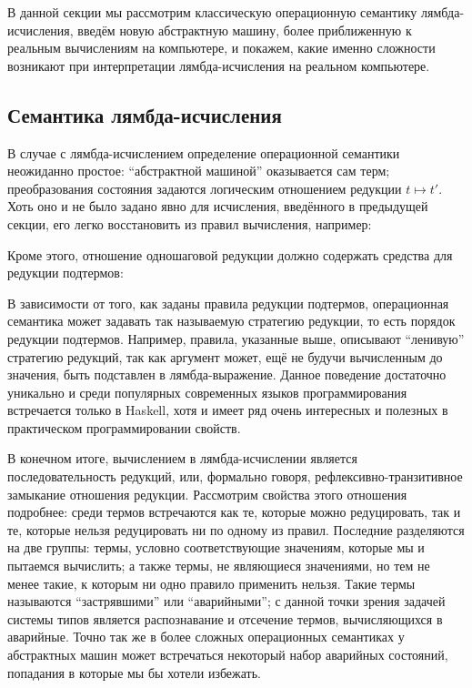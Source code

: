 \documentclass[12pt]{article}
\begin{document}
В данной секции мы рассмотрим классическую операционную семантику
лямбда-исчисления, введём новую абстрактную машину, более приближенную к
реальным вычислениям на компьютере, и покажем, какие именно сложности возникают
при интерпретации лямбда-исчисления на реальном компьютере.

\subsection{Семантика лямбда-исчисления}

В случае с лямбда-исчислением определение операционной семантики неожиданно
простое: ``абстрактной машиной'' оказывается сам терм; преобразования состояния
задаются логическим отношением редукции $t \mapsto t'$. Хоть оно и не было
задано явно для исчисления, введённого в предыдущей секции, его легко
восстановить из правил вычисления, например:

Кроме этого, отношение одношаговой редукции должно содержать средства для
редукции подтермов:

В зависимости от того, как заданы правила редукции подтермов, операционная
семантика может задавать так называемую стратегию редукции, то есть порядок
редукции подтермов. Например, правила, указанные выше, описывают ``ленивую''
стратегию редукций, так как аргумент может, ещё не будучи вычисленным до
значения, быть подставлен в лямбда-выражение. Данное поведение достаточно
уникально и среди популярных современных языков программирования встречается
только в Haskell, хотя и имеет ряд очень интересных и полезных в практическом
программировании свойств.

В конечном итоге, вычислением в лямбда-исчислении является последовательность
редукций, или, формально говоря, рефлексивно-транзитивное замыкание отношения
редукции. Рассмотрим свойства этого отношения подробнее: среди термов
встречаются как те, которые можно редуцировать, так и те, которые нельзя
редуцировать ни по одному из правил. Последние разделяются на две группы: термы,
условно соответствующие значениям, которые мы и пытаемся вычислить; а также
термы, не являющиеся значениями, но тем не менее такие, к которым ни одно
правило применить нельзя. Такие термы называются ``застрявшими'' или
``аварийными''; с данной точки зрения задачей системы типов является
распознавание и отсечение термов, вычисляющихся в аварийные. Точно так же в
более сложных операционных семантиках у абстрактных машин может встречаться
некоторый набор аварийных состояний, попадания в которые мы бы хотели избежать.
\end{document}
